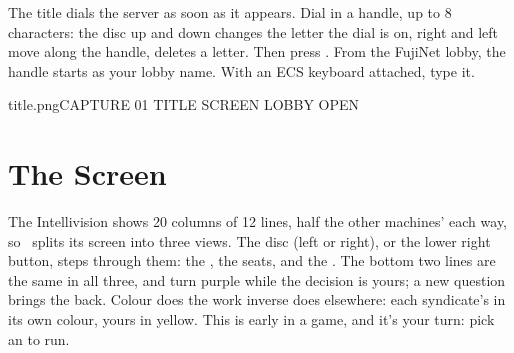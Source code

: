 \documentclass[12pt,letterpaper]{article}
\begin{document}
The title dials the server as soon as it appears. Dial in a handle, up to 8 characters: the disc up and down
changes the letter the dial is on, right and left move along the handle,  deletes a letter. Then press
. From the FujiNet lobby, the handle starts as your lobby name. With an ECS keyboard attached, type it.

\begin{capture}{title.png}{CAPTURE 01 \quad TITLE SCREEN \quad LOBBY OPEN}
\end{capture}

\begin{legend}
\end{legend}

\renewcommand{\secstatus}{20 COLUMNS \quad // \quad THREE VIEWS \quad // \quad COLOUR}
\chapter{The Screen}
\begin{sloppypar}
The Intellivision shows 20 columns of 12 lines, half the other machines' each way, so \game\ splits its screen
into three views. The disc (left or right), or the lower right button, steps through them: the , the
seats, and the . The bottom two lines are the same in all three, and turn purple while the decision is
yours; a new question brings the  back. Colour does the work inverse does elsewhere: each syndicate's
 in its own colour, yours in yellow. This is early in a game, and it's your turn: pick an  to
run.
\end{sloppypar}
\end{document}
